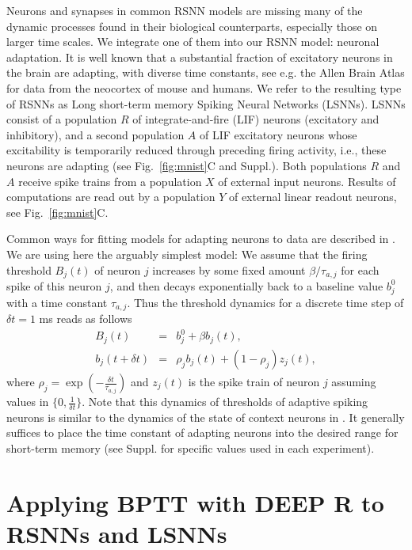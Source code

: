 \documentclass{article} \pdfoutput=1
\begin{document}
Neurons and synapses in common RSNN models are missing many of the dynamic processes found in their biological counterparts, especially those on larger time scales. We integrate one of them into our RSNN model: neuronal adaptation. It is well known that a substantial fraction of excitatory neurons in the brain are adapting, with diverse time constants, see e.g. the Allen Brain Atlas for data from the neocortex of mouse and humans. We refer to the resulting type of RSNNs as Long short-term memory Spiking Neural Networks (LSNNs).
LSNNs consist of a population $R$ of integrate-and-fire (LIF) neurons (excitatory and inhibitory), and a second population $A$ of LIF excitatory neurons whose excitability is temporarily reduced through preceding firing activity, i.e., these neurons are adapting (see Fig.~\ref{fig:mnist}C and Suppl.). Both populations $R$ and $A$ receive spike trains from a population $X$ of external input neurons. Results of computations are read out by a population $Y$ of external linear readout neurons, see Fig.~\ref{fig:mnist}C.

Common ways for fitting models for adapting neurons to data are described in \cite{gerstner2014neuronal,pozzorini2015automated,gouwens2018systematic,teeter2018generalized}. We are using here the arguably simplest model: We assume that the firing threshold $B_{j}(t)$ of neuron $j$ increases by some fixed amount $\beta / \tau_{a,j}$ for each spike of this neuron $j$, and then decays exponentially back to a baseline value $b_{j}^0$ with a time constant $\tau_{a,j}$. Thus the threshold dynamics for a discrete time step of $\delta t = 1$ ms reads as follows
\begin{eqnarray}
B_{j}(t) 		& = & b_{j}^0 + \beta b_j(t) , \\
b_{j}(t + \delta t) 	& = & \rho_j b_{j}(t) + (1 - \rho_j) z_j(t) ,
\end{eqnarray}
where $\rho_j=\exp(-\frac{\delta t}{\tau_{a,j}})$ and $z_j(t)$ is the spike train of neuron $j$ assuming values in $\{0,\frac{1}{\delta t}\}$.
Note that this dynamics of thresholds of adaptive spiking neurons is similar to the dynamics of the state of context neurons in \cite{mikolov2014learning}.
It generally suffices to place the time constant of adapting neurons into the desired range for short-term memory (see Suppl. for specific values used in each experiment).


\section{Applying BPTT with DEEP R to RSNNs and LSNNs}\label{sec:BPTT}
\end{document}

